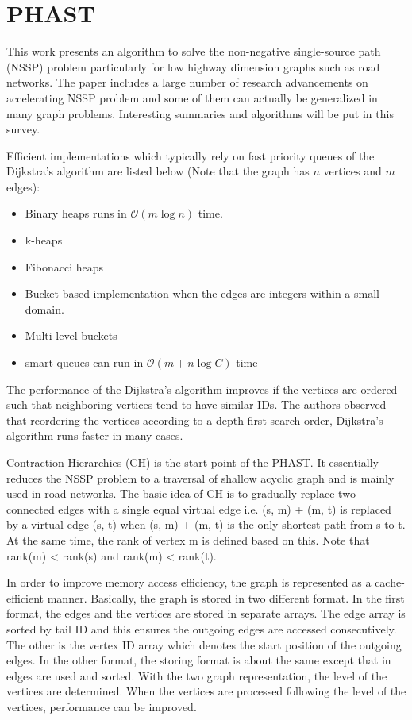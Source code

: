 \section{PHAST}
This work\cite{delling2013phast} presents an algorithm to solve the non-negative single-source
path (NSSP) problem particularly for low highway dimension graphs such as road
networks. The paper includes a large number of research advancements on
accelerating NSSP problem and some of them can actually be generalized in many graph problems. 
Interesting summaries and algorithms will be put in this survey.

Efficient implementations which typically rely on fast priority queues of the
Dijkstra's algorithm are listed below (Note that the graph has $n$ vertices and
$m$ edges):
\begin{itemize}
    \item Binary heaps runs in $\mathcal{O}(m\log{}n)$ time. 
    \item k-heaps
    \item Fibonacci heaps
    \item Bucket based implementation when the edges are integers within a small
        domain.
    \item Multi-level buckets
    \item smart queues can run in $\mathcal{O}(m + n \log{}C)$ time
\end{itemize}

The performance of the Dijkstra's algorithm improves if the vertices are ordered
such that neighboring vertices tend to have similar IDs. 
The authors observed that reordering the vertices according to a
depth-first search order, Dijkstra's algorithm runs faster in many cases.

Contraction Hierarchies (CH) \cite{geisberger2008contraction} is the 
start point of the PHAST. It essentially reduces the NSSP problem to a traversal
of shallow acyclic graph and is mainly used in road networks. The basic idea of
CH is to gradually replace two connected edges with a single equal virtual edge
i.e. (s, m) + (m, t) is replaced by a virtual edge (s, t) when (s, m) + (m, t) is the only
shortest path from s to t. At the same time, the rank of vertex m is defined
based on this. Note that rank(m) < rank(s) and rank(m) < rank(t).

In order to improve memory access efficiency, the graph is represented as a
cache-efficient manner. Basically, the graph is stored in two different format.
In the first format, the edges and the vertices are stored in
separate arrays. The edge array is sorted by tail ID and this ensures the
outgoing edges are accessed consecutively. The other is the vertex ID array
which denotes the start position of the outgoing edges. In the other format, the
storing format is about the same except that in edges are used and sorted.
With the two graph representation, the level of the vertices are determined.
When the vertices are processed following the level of the vertices, performance
can be improved.

